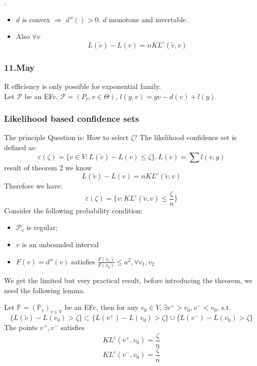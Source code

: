 \begin{remark}.
	\begin{itemize}
		\item $d$ is convex $\Rightarrow$ $d''() >0$. $d$ monotone and invertable.
		\item Also $\forall v$ 
		\begin{equation*}
			L(\tilde{v}) - L(v) = n KL^c(\tilde{v}, v)
		\end{equation*}
	\end{itemize}
\end{remark}



\subsubsection*{11.May}
R efficiency is only possible for exponential family.\\
Let $\mathcal{P}$ be an EFc, $\mathcal{P} = (P_v, v \in \Theta)$, $l(y, v) = yv - d(v) + l(y)$




\subsubsection*{Likelihood based confidence sets}
The principle Question is: How to select $\zeta$? The likelihood confidence set is defined as:
\begin{equation*}
	\varepsilon(\zeta) = \{ v \in V: L(\tilde{v}) - L(v) \leq \zeta \}, L(v) = \sum l(v, y)
\end{equation*}
result of theorem 2 we know
\begin{equation*}
	L(\tilde{v}) - L(v) = n KL^c(\tilde{v}, v)
\end{equation*}
Therefore we have:
\begin{equation*}
	\varepsilon(\zeta) = \{v : KL^c(\tilde{v}, v) \leq \frac{\zeta}{n} \}
\end{equation*}
Consider the following probability condition:
\begin{itemize}
	\item $\mathcal{P}_v$ is regular;
	\item $v$ is an unbounded interval
	\item $F(v) = d''(v)$ satisfies $\frac{F(v_1)}{F(v_2)} \leq a^2, \forall v_1, v_2$
\end{itemize}
We get the limited but very practical result, before introducing the theorem, we need the following lemma.
\begin{lemma}
	Let $\mathbb{P} = (\mathbb{P}_v)_{v \in V}$ be an EFc, then for any $v_0 \in V, \exists v^+ > v_0, v^-< v_0$, s.t.
	\begin{equation*}
		\{ L(\tilde{v}) - L(v_0) > \zeta  \} \subset \{ L(v^+) - L(v_0) > \zeta\} \cup \{L(v^-) - L(v_0) > \zeta \}
	\end{equation*}
	The points $v^+, v^-$ satisfies 
	\begin{equation*}
		KL^c(v^+, v_0) = \frac{\zeta}{n}
	\end{equation*}
	\begin{equation*}
		KL^c(v^-, v_0) = \frac{\zeta}{n}
	\end{equation*}
\end{lemma}


